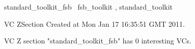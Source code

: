 \documentclass{article}
\begin{document}

\begin{zsection}
	 \SECTION standard\_toolkit\_fsb \parents~fsb\_toolkit , standard\_toolkit
\end{zsection}

VC ZSection Created at Mon Jan 17 16:35:51 GMT 2011.



 VC Z section "standard_toolkit_fsb" has $0$ interesting VCs.



\end{document}
